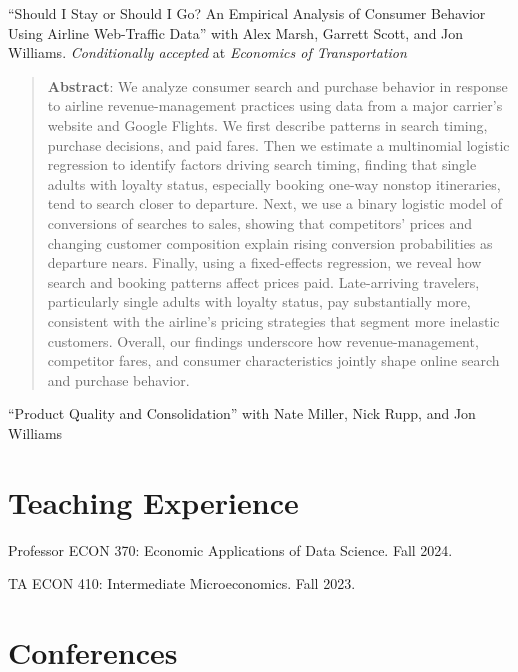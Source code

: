 \documentclass[12pt,letterpaper]{report}
\newcommand{\listitemspace}{0.25em}
\renewenvironment{itemize}
{\begin{list}{}{\setlength{\leftmargin}{0em}
			\setlength{\parskip}{0em}
			\setlength{\itemsep}{\listitemspace}
			\setlength{\parsep}{\listitemspace}}}
	{\end{list}}
\begin{document}
    \begin{itemize}
        \item ``Should I Stay or Should I Go? An Empirical Analysis of Consumer Behavior Using Airline Web-Traffic Data'' with Alex Marsh, Garrett Scott, and Jon Williams. \textit{Conditionally accepted} at \textit{Economics of Transportation}
        \begin{quote}
			\textbf{Abstract}: We analyze consumer search and purchase behavior in response to airline revenue-management practices using data from a major carrier's website and Google Flights. We first describe patterns in search timing, purchase decisions, and paid fares. Then we estimate a multinomial logistic regression to identify factors driving search timing, finding that single adults with loyalty status, especially booking one-way nonstop itineraries, tend to search closer to departure. Next, we use a binary logistic model of conversions of searches to sales, showing that competitors' prices and changing customer composition explain rising conversion probabilities as departure nears. Finally, using a fixed-effects regression, we reveal how search and booking patterns affect prices paid. Late-arriving travelers, particularly single adults with loyalty status, pay substantially more, consistent with the airline's pricing strategies that segment more inelastic customers. Overall, our findings underscore how revenue-management, competitor fares, and consumer characteristics jointly shape online search and purchase behavior.
		\end{quote}
        \item ``Product Quality and Consolidation'' with Nate Miller, Nick Rupp, and Jon Williams
    \end{itemize}

	\section*{Teaching Experience}
	
	\begin{tablist}
        \item[Professor] \tab{}ECON 370: Economic Applications of Data Science. Fall 2024.
		\item[TA] \tab{}ECON 410: Intermediate Microeconomics. Fall 2023.
	\end{tablist}

    \section*{Conferences}
	
\end{document}
